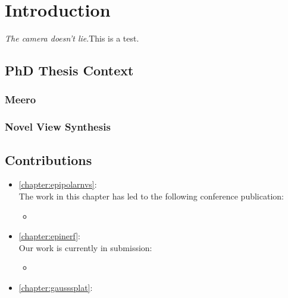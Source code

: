\chapter{Introduction}
\label{chapter:introduction}

{}


\emph{The camera doesn't lie}.This is a test. 
\section{PhD Thesis Context}

\subsection{Meero}

\subsection{Novel View Synthesis}
\section{Contributions}

\begin{itemize}
      \item \autoref{chapter:epipolarnvs}: \\
            The work in this chapter has led to the following 
            conference publication:
            \begin{itemize}
                \item {}
            \end{itemize}


      \item \autoref{chapter:epinerf}: \\
      Our work is currently in submission:
            \begin{itemize}
                  \item {}
            \end{itemize}

      \item \autoref{chapter:gausssplat}: \\
             
\end{itemize}
